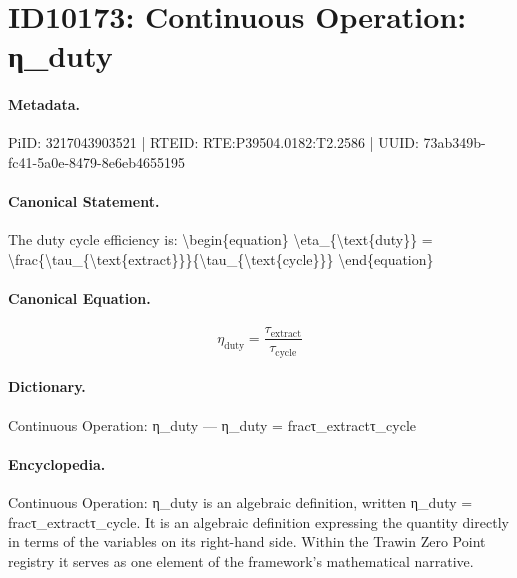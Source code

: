 \section*{ID10173: Continuous Operation: η\_duty}
\paragraph{Metadata.}
PiID: 3217043903521 | RTEID: RTE:P39504.0182:T2.2586 | UUID: 73ab349b-fc41-5a0e-8479-8e6eb4655195

\paragraph{Canonical Statement.}
The duty cycle efficiency is: \textbackslash{}begin\{equation\} \textbackslash{}eta\_\{\textbackslash{}text\{duty\}\} = \textbackslash{}frac\{\textbackslash{}tau\_\{\textbackslash{}text\{extract\}\}\}\{\textbackslash{}tau\_\{\textbackslash{}text\{cycle\}\}\} \textbackslash{}end\{equation\}

\paragraph{Canonical Equation.}
\[
\eta_{\text{duty}} = \frac{\tau_{\text{extract}}}{\tau_{\text{cycle}}}
\]

\paragraph{Dictionary.}
Continuous Operation: η\_duty — η\_duty = fracτ\_extractτ\_cycle

\paragraph{Encyclopedia.}
Continuous Operation: η\_duty is an algebraic definition, written η\_duty = fracτ\_extractτ\_cycle. It is an algebraic definition expressing the quantity directly in terms of the variables on its right-hand side. Within the Trawin Zero Point registry it serves as one element of the framework's mathematical narrative.
